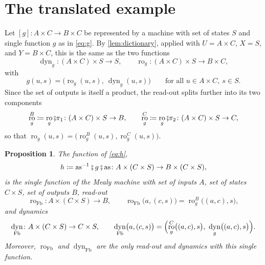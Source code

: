 \documentclass[11pt,a4paper]{article}
\theoremstyle{plain}
\newtheorem*{proposition}{Proposition}
\theoremstyle{remark}
\DeclareMathOperator{\dyn}{dyn}
\DeclareMathOperator{\ro}{ro}
\DeclareMathOperator{\Fb}{Fb}
\newcommand{\as}{\mathrm{as}}
\newcommand{\then}{\mathbin{\fatsemi}}
\begin{document}
\section{The translated example}

Let $[g] \colon A \times C \to B \times C$ be represented by a machine with set of states $S$ and single function $g$ as in \cref{eq:g}.
By \cref{lem:dictionary}, applied with $U = A \times C$, $X = S$, and $Y = B \times C$, this is the same as the two functions
\begin{equation}
    \dyn_g \colon (A \times C) \times S \to S, \qquad \ro_g \colon (A \times C) \times S \to B \times C,
\end{equation}
with
\begin{equation}
    \label{eq:g-split}
    g(u, s) = \bigl(\ro_g(u, s),\ \dyn_g(u, s)\bigr) \qquad \text{for all } u \in A \times C,\ s \in S.
\end{equation}
Since the set of outputs is itself a product, the read-out splits further into its two components
\begin{equation}
    \ro_g^{B} \coloneqq \ro_g \then \pi_1 \colon (A \times C) \times S \to B,
    \qquad
    \ro_g^{C} \coloneqq \ro_g \then \pi_2 \colon (A \times C) \times S \to C,
\end{equation}
so that $\ro_g(u, s) = \bigl(\ro_g^{B}(u, s), \ro_g^{C}(u, s)\bigr)$.

\begin{proposition}
    The function of \cref{eq:h},
    \begin{equation*}
        h \coloneqq \as^{-1} \then g \then \as \colon A \times (C \times S) \to B \times (C \times S),
    \end{equation*}
    is the single function of the Mealy machine with set of inputs $A$, set of states $C \times S$, set of outputs $B$, read-out
    \begin{equation}
        \label{eq:ro-fb}
        \ro_{\Fb} \colon A \times (C \times S) \to B, \qquad
        \ro_{\Fb}\bigl(a, (c, s)\bigr) = \ro_g^{B}\bigl((a, c), s\bigr),
    \end{equation}
    and dynamics
    \begin{equation}
        \label{eq:dyn-fb}
        \dyn_{\Fb} \colon A \times (C \times S) \to C \times S, \qquad
        \dyn_{\Fb}\bigl(a, (c, s)\bigr) = \Bigl(\ro_g^{C}\bigl((a, c), s\bigr),\ \dyn_g\bigl((a, c), s\bigr)\Bigr).
    \end{equation}
    Moreover, $\ro_{\Fb}$ and $\dyn_{\Fb}$ are the only read-out and dynamics with this single function.
\end{proposition}
\end{document}
